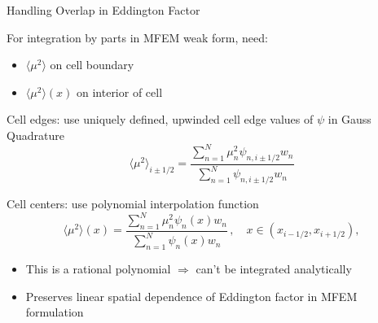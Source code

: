 \documentclass[10pt]{beamer}
\newcommand{\edd}{\langle \mu^2 \rangle}
\begin{document}
\begin{frame}{Handling Overlap in Eddington Factor}

	For integration by parts in MFEM weak form, need:
	\begin{itemize}
		\item $\edd$ on cell boundary 
		\item $\edd(x)$ on interior of cell 
	\end{itemize}

	Cell edges: use uniquely defined, upwinded cell edge values of $\psi$ in Gauss Quadrature 
	\begin{equation*} \label{lldg:edde}
		\edd_{i\pm 1/2} = \frac{
			\sum_{n=1}^N \mu_n^2 \psi_{n,i\pm 1/2} w_n
		}{
			\sum_{n=1}^N \psi_{n,i\pm 1/2} w_n 
		} 
	\end{equation*}

	Cell centers: use polynomial interpolation function 
	\begin{equation*} \label{lldg:eddi}
			\edd(x) = \frac{
				\sum_{n=1}^N \mu_n^2 \psi_{n}(x) w_n
			}{
				\sum_{n=1}^N \psi_{n}(x) w_n 
			} \,, \quad x\in(x_{i-1/2},x_{i+1/2}),
		\end{equation*}

	\begin{itemize}
		\item This is a rational polynomial $\Rightarrow$ can't be integrated analytically 

		\item Preserves linear spatial dependence of Eddington factor in MFEM formulation 

	\end{itemize}

\end{frame}
\end{document}
